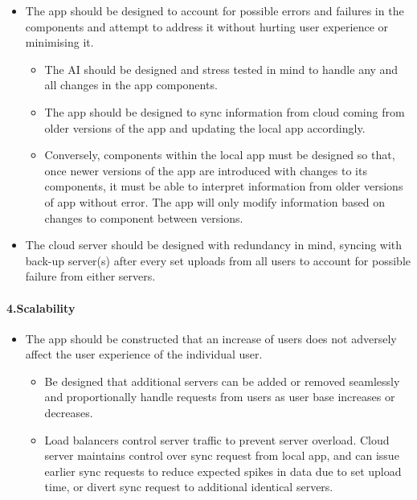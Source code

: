 \documentclass[a4paper,11pt]{article} %
\begin{document}
\begin{itemize}
\item
  The app should be designed to account for possible errors and failures
  in the components and attempt to address it without hurting user
  experience or minimising it.

  \begin{itemize}
  \item
    The AI should be designed and stress tested in mind to handle any
    and all changes in the app components.
  \item
    The app should be designed to sync information from cloud coming
    from older versions of the app and updating the local app
    accordingly.
  \item
    Conversely, components within the local app must be designed so
    that, once newer versions of the app are introduced with changes to
    its components, it must be able to interpret information from older
    versions of app without error. The app will only modify information
    based on changes to component between versions.
  \end{itemize}
\item
  The cloud server should be designed with redundancy in mind, syncing
  with back-up server(s) after every set uploads from all users to
  account for possible failure from either servers.
\end{itemize}

\hypertarget{scalability}{%
\paragraph{4.Scalability}\label{scalability}}

\begin{itemize}
\item
  The app should be constructed that an increase of users does not
  adversely affect the user experience of the individual user.

  \begin{itemize}
  \item
    Be designed that additional servers can be added or removed
    seamlessly and proportionally handle requests from users as user
    base increases or decreases.
  \item
    Load balancers control server traffic to prevent server overload.
    Cloud server maintains control over sync request from local app, and
    can issue earlier sync requests to reduce expected spikes in data
    due to set upload time, or divert sync request to additional
    identical servers.
  \end{itemize}
\end{itemize}
\end{document}
